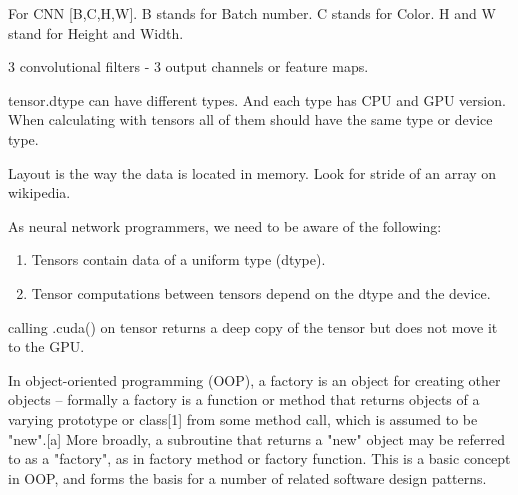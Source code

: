 \documentclass[11pt,twoside,a4paper]{report}
\begin{document}
For CNN [B,C,H,W]. B stands for Batch number. C stands for Color. 
H and W stand for Height and Width.

3 convolutional filters - 3 output channels or feature maps.

tensor.dtype can have different types. And each type has CPU and GPU version. When calculating with tensors all of 
them should have the same type or device type.

Layout is the way the data is located in memory. Look for stride of an array on wikipedia.

As neural network programmers, we need to be aware of the following:

\begin{enumerate}
    \item Tensors contain data of a uniform type (dtype).
    \item Tensor computations between tensors depend on the dtype and the device.
\end{enumerate}

calling .cuda() on tensor returns a deep copy of the tensor but does not move it to the GPU.

In object-oriented programming (OOP), a factory is an object for creating other objects – formally a factory is a function or method that returns objects of a varying prototype or class[1] from some method call, which is assumed to be "new".[a] More broadly, a subroutine that returns a "new" object may be referred to as a "factory", as in factory method or factory function. This is a basic concept in OOP, and forms the basis for a number of related software design patterns.
\end{document}

